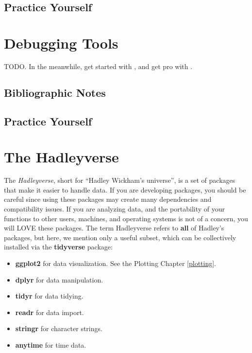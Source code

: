 \documentclass[]{book}
\providecommand{\tightlist}{%
  \setlength{\itemsep}{0pt}\setlength{\parskip}{0pt}}
\theoremstyle{definition}
\theoremstyle{definition}
\theoremstyle{definition}
\theoremstyle{remark}
\begin{document}
\hypertarget{practice-yourself-15}{%
\section{Practice Yourself}\label{practice-yourself-15}}

\hypertarget{debugging}{%
\chapter{Debugging Tools}\label{debugging}}

TODO.
In the meanwhile, get started with \citet{wickham2011testthat}, and get pro with \citet{cotton2017testing}.

\hypertarget{bibliographic-notes-18}{%
\section{Bibliographic Notes}\label{bibliographic-notes-18}}

\hypertarget{practice-yourself-16}{%
\section{Practice Yourself}\label{practice-yourself-16}}

\hypertarget{hadley}{%
\chapter{The Hadleyverse}\label{hadley}}

The \emph{Hadleyverse}, short for ``Hadley Wickham's universe'', is a set of packages that make it easier to handle data.
If you are developing packages, you should be careful since using these packages may create many dependencies and compatibility issues.
If you are analyzing data, and the portability of your functions to other users, machines, and operating systems is not of a concern, you will LOVE these packages.
The term Hadleyverse refers to \textbf{all} of Hadley's packages, but here, we mention only a useful subset, which can be collectively installed via the \textbf{tidyverse} package:

\begin{itemize}
\tightlist
\item
  \textbf{ggplot2} for data visualization. See the Plotting Chapter \ref{plotting}.
\item
  \textbf{dplyr} for data manipulation.
\item
  \textbf{tidyr} for data tidying.
\item
  \textbf{readr} for data import.
\item
  \textbf{stringr} for character strings.
\item
  \textbf{anytime} for time data.
\end{itemize}
\end{document}
